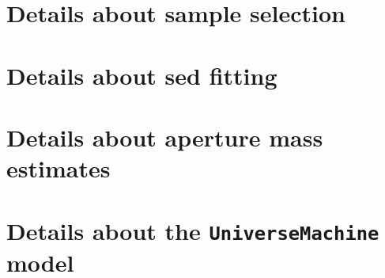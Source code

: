 \documentclass[a4paper,fleqn,usenatbib]{mnras}
\def\um{\texttt{UniverseMachine}}
\begin{document}

\appendix

\section{Details about sample selection} 
	\label{app:sample} 

\section{Details about sed fitting} 
	\label{app:sed} 

\section{Details about aperture mass estimates} 
	\label{app:sed} 
	
\section{Details about the \um{} model} 
	\label{app:model} 
\end{document}

